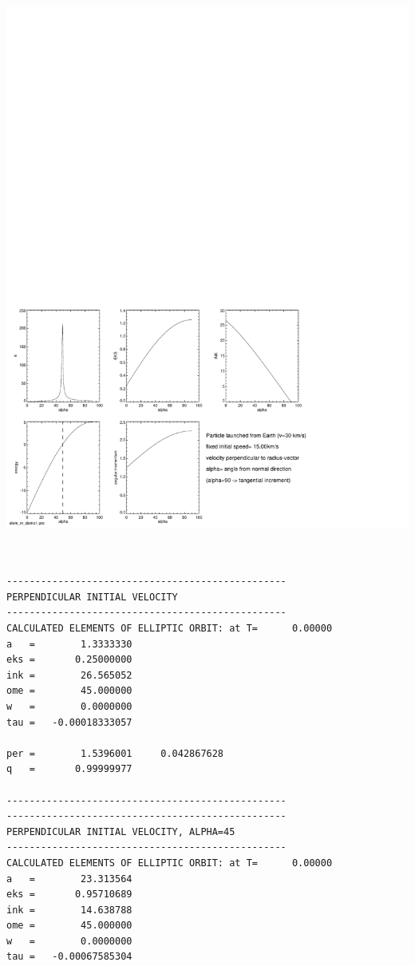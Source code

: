 \documentclass[a4paper,12pt]{article}
\begin{document}
{{{\vspace{-14cm}
\includegraphics[height=1.23\paperwidth]{elem_rv_demo1.pdf}


\newpage
{\scriptsize
\begin{verbatim}


-------------------------------------------------
PERPENDICULAR INITIAL VELOCITY
-------------------------------------------------
CALCULATED ELEMENTS OF ELLIPTIC ORBIT: at T=      0.00000
a   =        1.3333330
eks =       0.25000000
ink =        26.565052
ome =        45.000000
w   =        0.0000000
tau =   -0.00018333057

per =        1.5396001     0.042867628
q   =       0.99999977

-------------------------------------------------
-------------------------------------------------
PERPENDICULAR INITIAL VELOCITY, ALPHA=45
-------------------------------------------------
CALCULATED ELEMENTS OF ELLIPTIC ORBIT: at T=      0.00000
a   =        23.313564
eks =       0.95710689
ink =        14.638788
ome =        45.000000
w   =        0.0000000
tau =   -0.00067585304


\end{verbatim}}}}}
\end{document}
